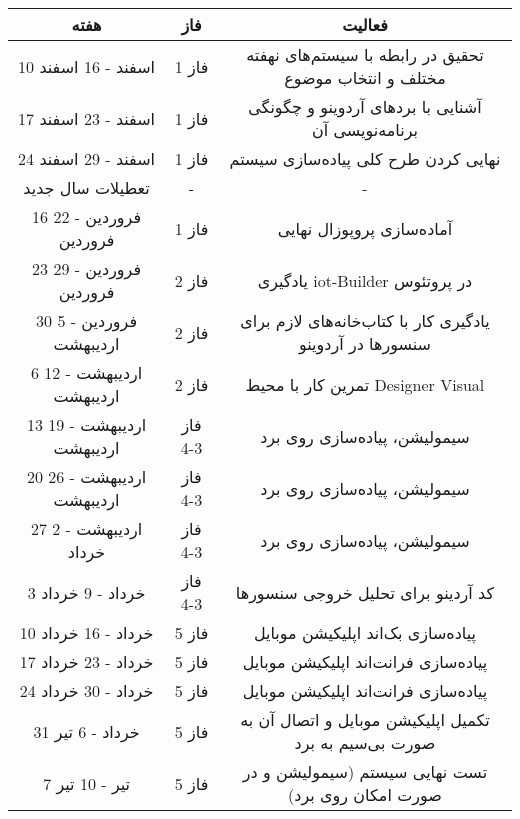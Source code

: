 \begin{table}[ht]
	\begin{center}
		\begin{tabular}{|c|c|c|}
			\hline
			
			هفته & فاز & فعالیت\\
			\hline
			\hline
			10 اسفند - 16 اسفند & فاز 1 &  تحقیق در رابطه با سیستم‌های نهفته مختلف و انتخاب موضوع\\												
			\hline
			17 اسفند - 23 اسفند & فاز 1 &  آشنایی با بردهای آردوینو و چگونگی برنامه‌نویسی آن\\												
			\hline
			24 اسفند - 29 اسفند & فاز 1 &  نهایی کردن طرح کلی پیاده‌سازی سیستم\\												
			
			\hline
			تعطیلات سال جدید & - &  -\\															
			\hline
			16 فروردین - 22 فروردین & فاز 1 &  آماده‌سازی پروپوزال نهایی \\					
			\hline
			\hline
			23 فروردین - 29 فروردین & فاز 2 &  یادگیری iot-Builder در پروتئوس \\					
			\hline
			30 فروردین - 5 اردیبهشت & فاز 2 &  یادگیری کار با کتاب‌خانه‌های لازم برای سنسور‌ها در آردوینو \\					
			\hline
			6 اردیبهشت - 12 اردیبهشت & فاز 2 &   	 تمرین کار با محیط ِDesigner Visual	\\
			\hline
			\hline
			13 اردیبهشت - 19 اردیبهشت & فاز 3-4 &   	 سیمولیشن، پیاده‌سازی روی برد	\\					
			\hline
			20 اردیبهشت - 26 اردیبهشت & فاز 3-4 &   	 سیمولیشن، پیاده‌سازی روی برد	\\					
			\hline
			27 اردیبهشت - 2 خرداد & فاز 3-4 &   	 سیمولیشن، پیاده‌سازی روی برد	\\		
			\hline
			
			3 خرداد - 9 خرداد & فاز 3-4 &   کد آردینو برای تحلیل خروجی سنسور‌ها\\					
			\hline
			\hline
			10 خرداد - 16 خرداد & فاز 5 &  پیاده‌سازی بک‌اند اپلیکیشن موبایل \\					
			\hline
			17 خرداد - 23 خرداد & فاز 5 &  پیاده‌سازی فرانت‌اند اپلیکیشن موبایل \\					
			\hline
			24 خرداد - 30 خرداد & فاز 5 &  پیاده‌سازی فرانت‌اند اپلیکیشن موبایل \\					
			\hline
			31 خرداد - 6 تیر & فاز 5 &  تکمیل اپلیکیشن موبایل و اتصال آن به صورت بی‌سیم به برد  \\					
			\hline
			7 تیر - 10 تیر & فاز 5 &  تست نهایی سیستم (سیمولیشن و در صورت امکان روی برد) \\					
			\hline
		\end{tabular}
	\end{center}	
\end{table}
\pagebreak

